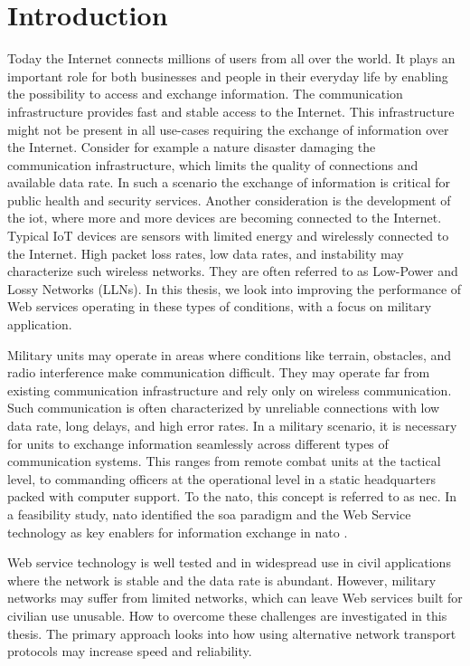 
\chapter{Introduction}

Today the Internet connects millions of users from all over the world. It plays
an important role for both businesses and people in their everyday life by
enabling the possibility to access and exchange information. The communication
infrastructure provides fast and stable access to the Internet. This
infrastructure might not be present in all use-cases requiring the exchange of
information over the Internet. Consider for example a nature disaster damaging
the communication infrastructure, which limits the quality of connections and
available data rate. In such a scenario the exchange of information is critical
for public health and security services. Another consideration is the
development of the \gls{iot}, where more and more devices are becoming connected
to the Internet. Typical IoT devices are sensors with limited energy and
wirelessly connected to the Internet. High packet loss rates, low data rates,
and instability may characterize such wireless networks. They are often referred
to as Low-Power and Lossy Networks (LLNs). In this thesis, we look into
improving the performance of Web services operating in these types of
conditions, with a focus on military application.


Military units may operate in areas where conditions like terrain, obstacles,
and radio interference make communication difficult. They may operate far from
existing communication infrastructure and rely only on wireless communication.
Such communication is often characterized by unreliable connections with low
data rate, long delays, and high error rates. In a military scenario, it is
necessary for units to exchange information seamlessly across different types of
communication systems. This ranges from remote combat units at the tactical
level, to commanding officers at the operational level in a static headquarters
packed with computer support. To the \gls{nato}, this concept is referred to as
\gls{nec}. In a feasibility study, \gls{nato} identified the \gls{soa} paradigm
and the Web Service technology as key enablers for information exchange in
\gls{nato} \cite{nnec-study}.

Web service technology is well tested and in widespread use in civil
applications where the network is stable and the data rate is abundant. However,
military networks may suffer from limited networks, which can leave Web services
built for civilian use unusable. How to overcome these challenges are
investigated in this thesis. The primary approach looks into how using
alternative network transport protocols may increase speed and reliability.

